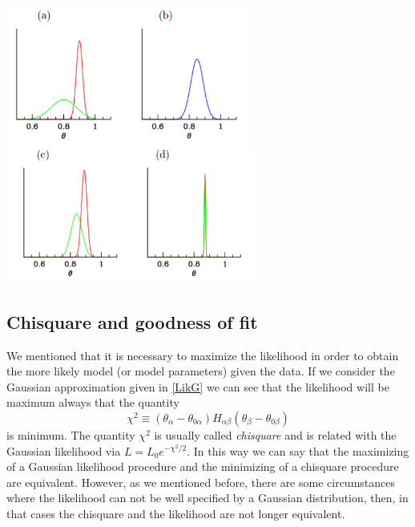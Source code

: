 \documentclass[onecolumn,           %
               showpacs,            %
               preprintnumbers,     %
               aps,                 %
               prl,          	    %
               letterpaper,             %
               superscriptaddress,      %
               nofootinbib,         %
               tightenlines,        %
               floats,floatfix      %
               ,usenatbib,
               ]{revtex4-1}
\begin{document}
\begin{minipage}{\textwidth}
\centering
\includegraphics[height=4.5cm]{g1.png}
\includegraphics[height=4.5cm]{g2.png}
\label{gausian1}
\end{minipage}
\subsection{Chisquare and goodness of fit}

We mentioned that it is necessary to maximize the likelihood in order to obtain the more likely model (or model parameters) given the data. If we consider the Gaussian approximation given in \eqref{LikG} we can see that the likelihood will be maximum always that the quantity
\begin{equation}\label{chi2}
\chi^2\equiv(\theta_\alpha-\theta_{0\alpha})H_{\alpha\beta}(\theta_\beta-\theta_{0\beta})
\end{equation}
is minimum. The quantity $\chi^2$ is usually called \textit{chisquare} and is related with the Gaussian likelihood via $L=L_0e^{-\chi^2/2}$. In this way we can say that the maximizing of a Gaussian likelihood procedure and the minimizing of a chisquare procedure are equivalent. However, as we mentioned before, there are some circumstances where the likelihood can not be well specified by a Gaussian distribution, then, in that cases the chisquare and the likelihood are not longer equivalent. 
\end{document}
